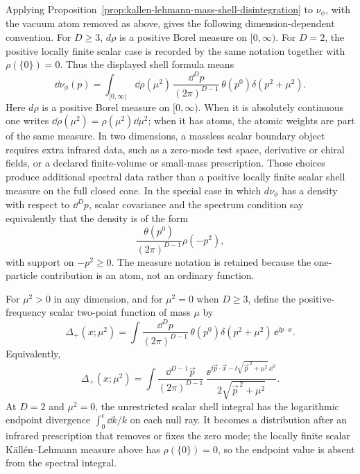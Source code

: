 \begin{definition}
\label{def:kallen-lehmann-spectral-measure}
Applying Proposition~\ref{prop:kallen-lehmann-mass-shell-disintegration} to
\(\nu_\phi\), with the vacuum atom removed as above, gives the following
dimension-dependent convention.  For \(D\ge3\), \(d\rho\) is a positive Borel
measure on \([0,\infty)\).  For \(D=2\), the positive locally finite scalar
case is recorded by the same notation together with
\(\rho(\{0\})=0\).  Thus the displayed shell formula means
\[
  \dd\nu_\phi(p)
  =
  \int_{[0,\infty)}
  \dd\rho(\mu^2)\,
  \frac{\dd^Dp}{(2\pi)^{D-1}}\,
  \theta(p^0)\delta(p^2+\mu^2).
\]
Here \(d\rho\) is a positive Borel measure on \([0,\infty)\). When it is
absolutely continuous one writes \(\dd\rho(\mu^2)=\rho(\mu^2)\dd\mu^2\);
when it has atoms, the atomic weights are part of the same measure.
In two dimensions, a massless scalar boundary object requires extra infrared
data, such as a zero-mode test space, derivative or chiral fields, or a
declared finite-volume or small-mass prescription.  Those choices produce
additional spectral data rather than a positive locally finite scalar shell
measure on the full closed cone.
In the special case in which \(d\nu_\phi\) has a density with respect to
\(\dd^Dp\), scalar covariance and the spectrum condition say equivalently that
the density is of the form
\[
  \frac{\theta(p^0)}{(2\pi)^{D-1}}\rho(-p^2),
\]
with support on \(-p^2\ge0\). The measure notation is retained because the
one-particle contribution is an atom, not an ordinary function.
\end{definition}

\begin{definition}
\label{def:positive-frequency-massive-scalar-distribution}
For \(\mu^2>0\) in any dimension, and for \(\mu^2=0\) when \(D\ge3\), define
the positive-frequency scalar two-point function of mass \(\mu\) by
\[
  \Delta_+(x;\mu^2)
  =
  \int\frac{\dd^Dp}{(2\pi)^{D-1}}\,
  \theta(p^0)\delta(p^2+\mu^2)\,
  \ee^{\ii p\cdot x}.
\]
Equivalently,
\[
  \Delta_+(x;\mu^2)
  =
  \int
  \frac{\dd^{D-1}\vec p}{(2\pi)^{D-1}}\,
  \frac{
    \ee^{\ii\vec p\cdot\vec x-\ii\sqrt{\vec p^{\,2}+\mu^2}\,x^0}
  }{2\sqrt{\vec p^{\,2}+\mu^2}} .
\]
At \(D=2\) and \(\mu^2=0\), the unrestricted scalar shell integral has the
logarithmic endpoint divergence
\(\int_0^\epsilon \dd k/k\) on each null ray.  It becomes a distribution after
an infrared prescription that removes or fixes the zero mode; the locally
finite scalar K\"all\'en--Lehmann measure above has \(\rho(\{0\})=0\), so the
endpoint value is absent from the spectral integral.
\end{definition}

